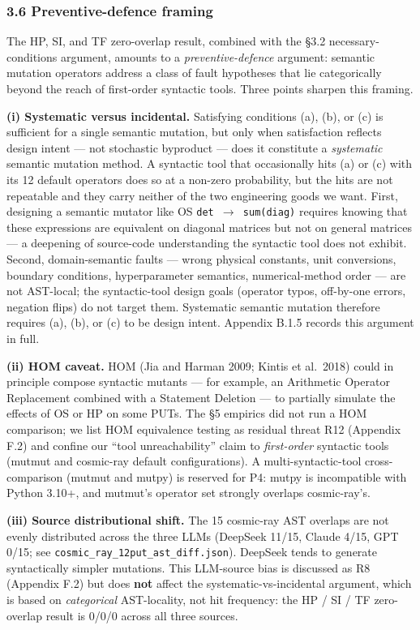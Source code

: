 \documentclass[review,12pt,authoryear]{elsarticle}
\begin{document}
\subsubsection{3.6 Preventive-defence
framing}\label{preventive-defence-framing}

The HP, SI, and TF zero-overlap result, combined with the §3.2
necessary-conditions argument, amounts to a \emph{preventive-defence}
argument: semantic mutation operators address a class of fault
hypotheses that lie categorically beyond the reach of first-order
syntactic tools. Three points sharpen this framing.

\textbf{(i) Systematic versus incidental.} Satisfying conditions (a),
(b), or (c) is sufficient for a single semantic mutation, but only when
satisfaction reflects design intent --- not stochastic byproduct ---
does it constitute a \emph{systematic} semantic mutation method. A
syntactic tool that occasionally hits (a) or (c) with its 12 default
operators does so at a non-zero probability, but the hits are not
repeatable and they carry neither of the two engineering goods we want.
First, designing a semantic mutator like OS \texttt{det\ $\to$\ sum(diag)}
requires knowing that these expressions are equivalent on diagonal
matrices but not on general matrices --- a deepening of source-code
understanding the syntactic tool does not exhibit. Second,
domain-semantic faults --- wrong physical constants, unit conversions,
boundary conditions, hyperparameter semantics, numerical-method order
--- are not AST-local; the syntactic-tool design goals (operator typos,
off-by-one errors, negation flips) do not target them. Systematic
semantic mutation therefore requires (a), (b), or (c) to be design
intent. Appendix B.1.5 records this argument in full.

\textbf{(ii) HOM caveat.} HOM (Jia and Harman 2009; Kintis et al.~2018)
could in principle compose syntactic mutants --- for example, an
Arithmetic Operator Replacement combined with a Statement Deletion ---
to partially simulate the effects of OS or HP on some PUTs. The §5
empirics did not run a HOM comparison; we list HOM equivalence testing
as residual threat R12 (Appendix F.2) and confine our ``tool
unreachability'' claim to \emph{first-order} syntactic tools (mutmut and
cosmic-ray default configurations). A multi-syntactic-tool
cross-comparison (mutmut and mutpy) is reserved for P4: mutpy is
incompatible with Python 3.10+, and mutmut's operator set strongly
overlaps cosmic-ray's.

\textbf{(iii) Source distributional shift.} The 15 cosmic-ray AST
overlaps are not evenly distributed across the three LLMs (DeepSeek
11/15, Claude 4/15, GPT 0/15; see
\texttt{cosmic\_ray\_12put\_ast\_diff.json}). DeepSeek tends to generate
syntactically simpler mutations. This LLM-source bias is discussed as R8
(Appendix F.2) but does \textbf{not} affect the systematic-vs-incidental
argument, which is based on \emph{categorical} AST-locality, not hit
frequency: the HP / SI / TF zero-overlap result is 0/0/0 across all
three sources.
\end{document}
